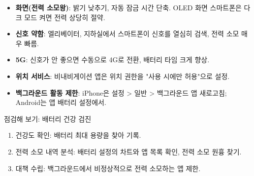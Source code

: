 
\begin{itemize}
  \item \textbf{화면(전력 소모왕)}: 밝기 낮추기, 자동 잠금 시간 단축. OLED 화면 스마트폰은 다크 모드 켜면 전력 상당히 절약.
  \item \textbf{신호 약함}: 엘리베이터, 지하실에서 스마트폰이 신호를 열심히 검색, 전력 소모 매우 빠름.
  \item \textbf{5G}: 신호가 안 좋으면 수동으로 4G로 전환, 배터리 타임 크게 향상.
  \item \textbf{위치 서비스}: 비내비게이션 앱은 위치 권한을 "사용 시에만 허용"으로 설정.
  \item \textbf{백그라운드 활동 제한}: iPhone은 설정 > 일반 > 백그라운드 앱 새로고침; Android는 앱 배터리 설정에서.
\end{itemize}

\begin{tcbpractice}{점검해 보기: 배터리 건강 검진}
\begin{enumerate}
  \item 건강도 확인: 배터리 최대 용량을 찾아 기록.
  \item 전력 소모 내역 분석: 배터리 설정의 차트와 앱 목록 확인, 전력 소모 원흉 찾기.
  \item 대책 수립: 백그라운드에서 비정상적으로 전력 소모하는 앱 제한.
\end{enumerate}

\end{tcbpractice}
